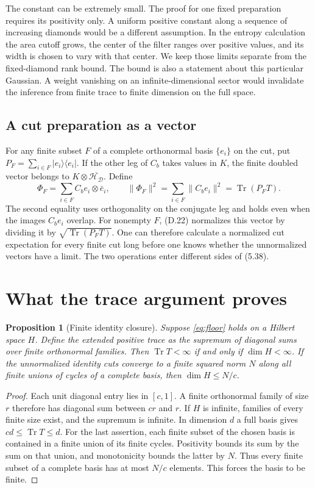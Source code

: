 \documentclass[11pt]{article}
\newcommand{\Tr}{\operatorname{Tr}}
\newcommand{\HH}{\mathcal H_{\mathcal D}}
\newtheorem{prop}{Proposition}
\newcommand{\parttitle}[2]{\clearpage\section{#1}\markboth{#2}{#2}}
\begin{document}
The constant can be extremely small. The proof for one fixed preparation requires its positivity only. A uniform positive constant along a sequence of increasing diamonds would be a different assumption. In the entropy calculation the area cutoff grows, the center of the filter ranges over positive values, and its width is chosen to vary with that center. We keep those limits separate from the fixed-diamond rank bound. The bound is also a statement about this particular Gaussian. A weight vanishing on an infinite-dimensional sector would invalidate the inference from finite trace to finite dimension on the full space.

\subsection{A cut preparation as a vector}
For any finite subset $F$ of a complete orthonormal basis $\{e_i\}$ on the cut, put $P_F=\sum_{i\in F}|e_i\rangle\langle e_i|$. If the other leg of $C_b$ takes values in $K$, the finite doubled vector belongs to $K\otimes\overline{\HH}$. Define
\begin{equation}\label{eq:norm}
\Phi_F=\sum_{i\in F} C_be_i\otimes\bar e_i,\qquad
\|\Phi_F\|^2=\sum_{i\in F}\|C_be_i\|^2=\Tr(P_FT).
\end{equation}
The second equality uses orthogonality on the conjugate leg and holds even when the images $C_be_i$ overlap. For nonempty $F$, (D.22) normalizes this vector by dividing it by $\sqrt{\Tr(P_FT)}$. One can therefore calculate a normalized cut expectation for every finite cut long before one knows whether the unnormalized vectors have a limit. The two operations enter different sides of (5.38).

\parttitle{What the trace argument proves}{The trace argument}
\begin{prop}[Finite identity closure]\label{prop:rank}
Suppose \eqref{eq:floor} holds on a Hilbert space $H$. Define the extended positive trace as the supremum of diagonal sums over finite orthonormal families. Then $\Tr T<\infty$ if and only if $\dim H<\infty$. If the unnormalized identity cuts converge to a finite squared norm $N$ along all finite unions of cycles of a complete basis, then $\dim H\le N/c$.
\end{prop}
\begin{proof}
Each unit diagonal entry lies in $[c,1]$. A finite orthonormal family of size $r$ therefore has diagonal sum between $cr$ and $r$. If $H$ is infinite, families of every finite size exist, and the supremum is infinite. In dimension $d$ a full basis gives $cd\le\Tr T\le d$. For the last assertion, each finite subset of the chosen basis is contained in a finite union of its finite cycles. Positivity bounds its sum by the sum on that union, and monotonicity bounds the latter by $N$. Thus every finite subset of a complete basis has at most $N/c$ elements. This forces the basis to be finite.
\end{proof}
\end{document}

